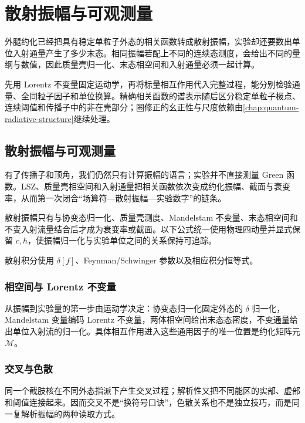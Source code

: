 \chapter{散射振幅与可观测量}\label{chap:relativistic-scattering}

外腿约化已经把具有稳定单粒子外态的相关函数转成散射振幅，实验却还要数出单位入射通量产生了多少末态。相同振幅若配上不同的连续态测度，会给出不同的量纲与数值，因此质量壳归一化、末态相空间和入射通量必须一起计算。

先用 Lorentz 不变量固定运动学，再将标量相互作用代入完整过程，能分别检验通量、全同粒子因子和单位换算。精确相关函数的谱表示随后区分稳定单粒子极点、连续阈值和传播子中的非在壳部分；圈修正的幺正性与尺度依赖由\cref{chap:quantum-radiative-structure}继续处理。

\section{散射振幅与可观测量}

有了传播子和顶角，我们仍然只有计算振幅的语言；实验并不直接测量 Green 函数。LSZ、质量壳相空间和入射通量把相关函数依次变成约化振幅、截面与衰变率，从而第一次闭合“场算符—散射振幅—实验数字”的链条。

散射振幅只有与协变态归一化、质量壳测度、Mandelstam 不变量、末态相空间和不变入射流量结合后才成为衰变率或截面。以下公式统一使用物理四动量并显式保留 $c,\hbar$，使振幅归一化与实验单位之间的关系保持可追踪。

散射积分使用 $\delta[f]$、Feynman/Schwinger 参数以及相应积分恒等式。

\subsection{相空间与 Lorentz 不变量}
从振幅到实验量的第一步由运动学决定：协变态归一化固定外态的 $\delta$ 归一化，Mandelstam 变量编码 Lorentz 不变量，两体相空间给出末态态密度，不变通量给出单位入射流的归一化。具体相互作用进入这些通用因子的唯一位置是约化矩阵元 $\mathcal M$。



\subsection{交叉与色散}
同一个截肢核在不同外态指派下产生交叉过程；解析性又把不同能区的实部、虚部和阈值连接起来。因而交叉不是“换符号口诀”，色散关系也不是独立技巧，而是同一复解析振幅的两种读取方式。


